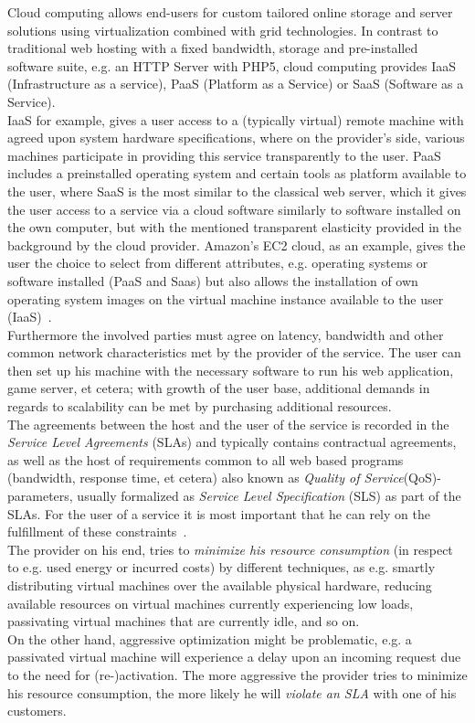\documentclass[a4paper]{llncs}
\begin{document}
Cloud computing allows end-users for custom tailored online storage and server solutions using virtualization combined with grid technologies. In contrast to traditional web hosting with a fixed bandwidth, storage and pre-installed software suite, e.g. an HTTP Server with PHP5, cloud computing provides IaaS (Infrastructure as a service), PaaS (Platform as a Service) or SaaS (Software as a Service).\\
IaaS for example, gives a user access to a (typically virtual) remote machine with agreed upon system hardware specifications, where on the provider’s side, various machines participate in providing this service transparently to the user. PaaS includes a preinstalled operating system and certain tools as platform available to the user, where SaaS is the most similar to the classical web server, which it gives the user access to a service via a cloud software similarly to software installed on the own computer, but with the mentioned transparent elasticity provided in the background by the cloud provider. Amazon’s EC2 cloud, as an example, gives the user the choice to select from different attributes, e.g. operating systems or software installed (PaaS and Saas) but also allows the installation of own operating system images on the virtual machine instance available to the user (IaaS)~\cite{Graubner}.\\
Furthermore the involved parties must agree on latency, bandwidth and other common network characteristics met by the provider of the service. The user can then set up his machine with the necessary software to run his web application, game server, et cetera; with growth of the user base, additional demands in regards to scalability can be met by purchasing additional resources.\\
The agreements between the host and the user of the service is recorded in the \textit{Service Level Agreements} (SLAs) and typically contains contractual agreements, as well as the host of requirements common to all web based programs (bandwidth, response time, et cetera) also known as \textit{Quality of Service}(QoS)-parameters, usually formalized as \textit{Service Level Specification} (SLS) as part of the SLAs. For the user of a service it is most important that he can rely on the fulfillment of these constraints~\cite{Undheim11}.\\

The provider on his end, tries to \textit{minimize his resource consumption} (in respect to e.g. used energy or incurred costs) by different techniques, as e.g. smartly distributing virtual machines over the available physical hardware, reducing available resources on virtual machines currently experiencing low loads, passivating virtual machines that are currently idle, and so on.\\
On the other hand, aggressive optimization might be problematic, e.g. a passivated virtual machine will experience a delay upon an incoming request due to the need for (re-)activation. The more aggressive the provider tries to minimize his resource consumption, the more likely he will \textit{violate an SLA} with one of his customers.\\
\end{document}
